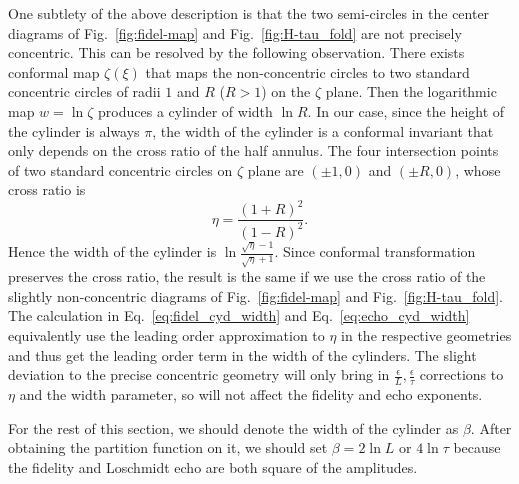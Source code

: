 One subtlety of the above description is that the two semi-circles in the center diagrams of Fig.~\ref{fig:fidel-map} and Fig.~\ref{fig:H-tau_fold} are not precisely concentric. This can be resolved by the following observation. There exists conformal map $\zeta(\xi)$ that maps the non-concentric circles to two standard concentric circles of radii $1$ and $R$ ($R>1$) on the $\zeta$ plane\cite{brown_complex_2009}. Then the logarithmic map $w = \ln \zeta$ produces a cylinder of width $\ln R$. In our case, since the height of the cylinder is always $\pi$, the width of the cylinder is a conformal invariant that only depends on the cross ratio of the half annulus. The four intersection points of two standard concentric circles on $\zeta$ plane are $(\pm 1,0)$ and $(\pm R,0)$, whose cross ratio is
\begin{equation}
\eta = \frac{(1 + R)^2}{(1 - R)^2}. 
\end{equation}
Hence the width of the cylinder is $\ln \frac{\sqrt{ \eta } - 1}{\sqrt{ \eta} + 1}$. Since conformal transformation preserves the cross ratio, the result is the same if we use the cross ratio of the slightly non-concentric diagrams of Fig.~\ref{fig:fidel-map} and Fig.~\ref{fig:H-tau_fold}. The calculation in Eq.~\eqref{eq:fidel_cyd_width} and Eq.~\eqref{eq:echo_cyd_width} equivalently use the leading order approximation to $\eta$ in the respective geometries and thus get the leading order term in the width of the cylinders. The slight deviation to the precise concentric geometry will only bring in $\frac{\epsilon}{L}, \frac{\epsilon}{\tau}$ corrections to $\eta$ and the width parameter, so will not affect the fidelity and echo exponents. 

For the rest of this section, we should denote the width of the cylinder as $\beta$. After obtaining the partition function on it, we should set $\beta = 2 \ln L$ or $ 4 \ln \tau$ because the fidelity and Loschmidt echo are both square of the amplitudes.

